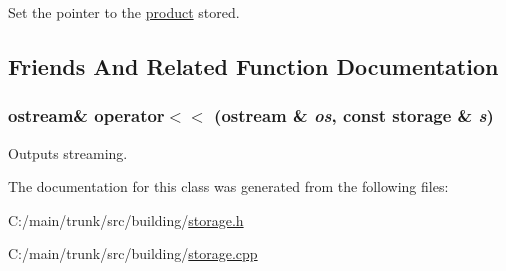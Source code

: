 Set the pointer to the \hyperlink{classproduct}{product} stored. 

\subsection{Friends And Related Function Documentation}
\hypertarget{classstorage_acb8dff690c7b169c45b30e4bf2dbe20a}{
\subsubsection[{operator$<$$<$}]{\setlength{\rightskip}{0pt plus 5cm}ostream\& operator$<$$<$ (ostream \& {\em os}, \/  const {\bf storage} \& {\em s})}}
\label{classstorage_acb8dff690c7b169c45b30e4bf2dbe20a}


Outputs streaming. 

The documentation for this class was generated from the following files:\begin{DoxyCompactItemize}
\item 
C:/main/trunk/src/building/\hyperlink{storage_8h}{storage.h}\item 
C:/main/trunk/src/building/\hyperlink{storage_8cpp}{storage.cpp}\end{DoxyCompactItemize}
